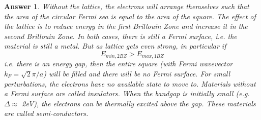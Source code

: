 \documentclass[a4paper]{article}
\newtheorem{ans}{Answer}[section]
\theoremstyle{new}
\begin{document}
\begin{ans}
Without the lattice, the electrons will arrange themselves such that the area of the circular Fermi sea is equal to the area of the square. The effect of the lattice is to reduce energy in the first Brillouin Zone and increase it in the second Brillouin Zone. In both cases, there is still a Fermi surface, i.e. the material is still a metal. But as lattice gets even strong, in particular if
$$E_{min,2BZ}>E_{max,1BZ}$$
i.e. there is an energy gap, then the entire square (with Fermi wavevector $k_F=\sqrt{2}\pi/a$) will be filled and there will be no Fermi surface. For small perturbations, the electrons have no available state to move to. Materials without a Fermi surface are called insulators. When the bandgap is initially small (e.g. $\Delta\approx$ 2eV), the electrons can be thermally excited above the gap. These materials are called semi-conductors.
\end{ans}
\newpage
\end{document}
